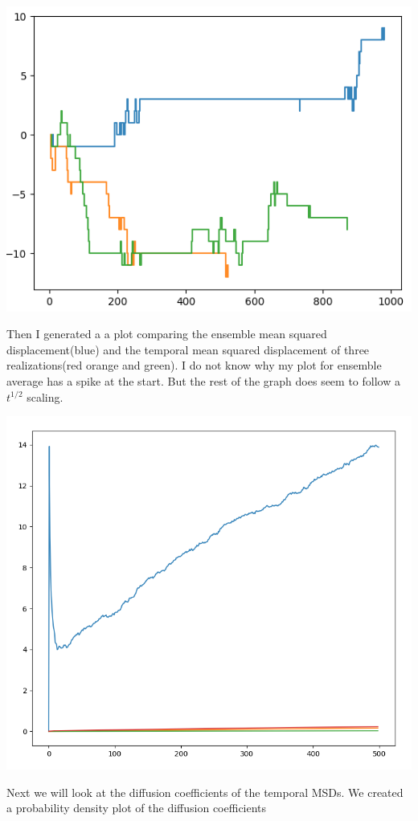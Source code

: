 \documentclass[12pt]{amsart}
\theoremstyle{definition}
\begin{document}
\begin{itemize}
\includegraphics[scale=.5]{rwhw3-fig1.png}

Then I generated a a plot comparing the ensemble mean squared displacement(blue) and the temporal mean squared displacement of three realizations(red orange and green). I do not know why my plot for ensemble average has a spike at the start. But the rest of the graph does seem to follow a $t^{1/2}$ scaling.

\includegraphics[scale=.6]{rwhw3-fig2.png}

Next we will look at the diffusion coefficients of the temporal MSDs. We created a probability density plot of the diffusion coefficients 


\end{itemize}
\end{document}
